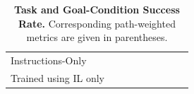 \documentclass[11pt,a4paper]{article}
\begin{document}
\begin{table}[]
{\begin{tabular}{@{}lllllllll@{}}
Instructions-Only        &                          &                               &                          &                               &                          &                               &                          &                               \\
Trained using IL only       &                          &                               &                          &                               &                          &                               &                          &                               \\\bottomrule
\end{tabular}}
\caption{\textbf{Task and Goal-Condition Success Rate.} Corresponding path-weighted metrics are given in parentheses.}
\label{tab:results}
\end{table}
\end{document}
